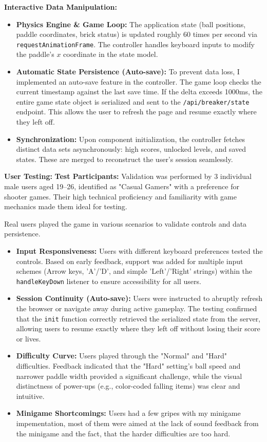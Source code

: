 \documentclass[11pt]{article}
\begin{document}
\textbf{Interactive Data Manipulation:}
\begin{itemize}
    \item \textbf{Physics Engine \& Game Loop:}
    The application state (ball positions, paddle coordinates, brick status) is updated roughly 60 times per second via \texttt{requestAnimationFrame}. The controller handles keyboard inputs to modify the paddle's $x$ coordinate in the state model.
    
    \item \textbf{Automatic State Persistence (Auto-save):}
    To prevent data loss, I implemented an auto-save feature in the controller. The game loop checks the current timestamp against the last save time. If the delta exceeds 1000ms, the entire game state object is serialized and sent to the \texttt{/api/breaker/state} endpoint. This allows the user to refresh the page and resume exactly where they left off.
    
    \item \textbf{Synchronization:}
    Upon component initialization, the controller fetches distinct data sets asynchronously: high scores, unlocked levels, and saved states. These are merged to reconstruct the user's session seamlessly.
\end{itemize}

\textbf{User Testing:}
\textbf{Test Participants:} Validation was performed by 3 individual male users aged 19–26, identified as "Casual Gamers" with a preference for shooter games. Their high technical proficiency and familiarity with game mechanics made them ideal for testing.

Real users played the game in various scenarios to validate controls and data persistence.
\begin{itemize}
    \item \textbf{Input Responsiveness:} Users with different keyboard preferences tested the controls. Based on early feedback, support was added for multiple input schemes (Arrow keys, 'A'/'D', and simple 'Left'/'Right' strings) within the \texttt{handleKeyDown} listener to ensure accessibility for all users.
    \item \textbf{Session Continuity (Auto-save):} Users were instructed to abruptly refresh the browser or navigate away during active gameplay. The testing confirmed that the \texttt{init} function correctly retrieved the serialized state from the server, allowing users to resume exactly where they left off without losing their score or lives.
    \item \textbf{Difficulty Curve:} Users played through the "Normal" and "Hard" difficulties. Feedback indicated that the "Hard" setting's ball speed and narrower paddle width provided a significant challenge, while the visual distinctness of power-ups (e.g., color-coded falling items) was clear and intuitive.
    \item \textbf{Minigame Shortcomings:} Users had a few gripes with my minigame impementation, most of them were aimed at the lack of sound feedback from the minigame and the fact, that the harder difficulties are too hard.
\end{itemize}
\end{document}
